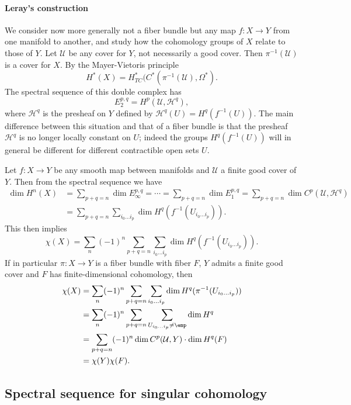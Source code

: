 \paragraph{Leray's construction}
We consider now more generally not a fiber bundle but any map $f:X\to Y$ from one manifold to another, and study how the cohomology groups of $X$ relate to those of $Y$. 
Let $\mathcal{U}$ be any cover for $Y$, not necessarily a good cover. Then $\pi^{-1}(\mathcal{U})$ is a cover for $X$. By the Mayer-Vietoris principle
\[H^*(X)=H^*_{TC}(C^*(\pi^{-1}(\mathcal{U}),\Omega^*).\]
The spectral sequence of this double complex has
\[E_2^{p,q}=H^p(\mathcal{U},\mathscr{H}^q),\]
where $\mathscr{H}^q$ is the presheaf on $Y$ defined by $\mathscr{H}^q(U)=H^q(f^{-1}(U))$.
The main difference between this situation and that of a fiber bundle is that the presheaf $\mathscr{H}^q$ is no longer locally constant on $U$; indeed the groups 
$H^q(f^{-1}(U))$ will in general be different for different contractible open sets $U$.
\begin{example}
Let $f:X\to Y$ be any smooth map between manifolds and $\mathcal{U}$ a finite good cover of $Y$. Then from the spectral sequence we have
\begin{align*}
\dim H^n(X)&=\sum_{p+q=n}\dim E_{\infty}^{p,q}=\cdots=\sum_{p+q=n}\dim E_{1}^{p,q}=\sum_{p+q=n}\dim C^p(\mathcal{U},\mathscr{H}^q)\\
&=\sum_{p+q=n}\sum_{i_0\dots i_p}\dim H^q(f^{-1}(U_{i_0\dots i_p})).
\end{align*}
This then implies
\[\chi(X)=\sum_n(-1)^n\sum_{p+q=n}\sum_{i_0\dots i_p}\dim H^q(f^{-1}(U_{i_0\dots i_p})).\]
If in particular $\pi:X\to Y$ is a fiber bundle with fiber $F$, $Y$ admits a finite good cover and $F$ has finite-dimensional cohomology, then
\begin{align*}
\chi(X)&=\sum_n(-1)^n\sum_{p+q=n}\sum_{i_0\dots i_p}\dim H^q(\pi^{-1}(U_{i_0\dots i_p}))\\
&=\sum_n(-1)^n\sum_{p+q=n}\sum_{U_{i_0\dots i_p}\neq\emp}\dim H^q\\
&=\sum_{p+q=n}(-1)^n\dim C^p(\mathcal{U},Y)\cdot \dim H^q(F)\\
&=\chi(Y)\chi(F).
\end{align*}
\end{example}
\subsection{Spectral sequence for singular cohomology}
